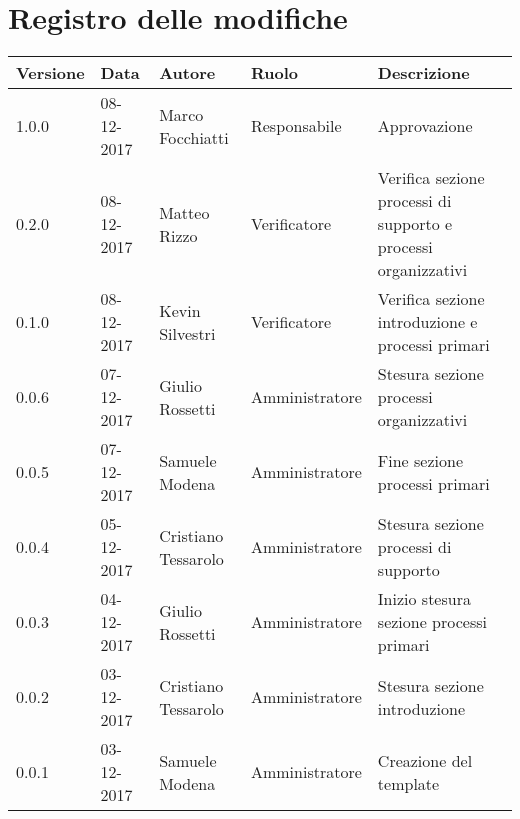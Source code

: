 \documentclass[./NormediProgetto.tex]{subfiles}
\begin{document}
\chapter*{Registro delle modifiche}
\begin{center}	
\begin{tabular}{|l|l|l|l|p{4cm}|}
		\hline
		\textbf{Versione} & \textbf{Data} & \textbf{Autore} & \textbf{Ruolo} & \textbf{Descrizione} \\ \hline \hline
		1.0.0 & 08-12-2017 & Marco Focchiatti & Responsabile & Approvazione\\ \hline
		0.2.0 & 08-12-2017 & Matteo Rizzo & Verificatore & Verifica sezione processi di supporto e processi organizzativi\\ \hline
		0.1.0 & 08-12-2017 & Kevin Silvestri & Verificatore & Verifica sezione introduzione e processi primari\\ \hline
		0.0.6 & 07-12-2017 & Giulio Rossetti & Amministratore & Stesura sezione processi organizzativi\\ \hline
		0.0.5 & 07-12-2017 & Samuele Modena & Amministratore & Fine sezione processi primari\\ \hline
		0.0.4 & 05-12-2017 & Cristiano Tessarolo & Amministratore & Stesura sezione processi di supporto\\ \hline
		0.0.3 & 04-12-2017 & Giulio Rossetti & Amministratore & Inizio stesura sezione processi primari\\ \hline
		0.0.2 & 03-12-2017 & Cristiano Tessarolo & Amministratore & Stesura sezione introduzione\\ \hline
		0.0.1 & 03-12-2017 & Samuele Modena & Amministratore & Creazione del template\\ \hline
\end{tabular}
\end{center}
\end{document}
